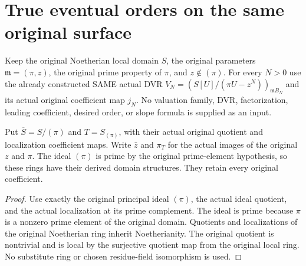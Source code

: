 \section{True eventual orders on the same original surface}

Keep the original Noetherian local domain $S$, the original parameters
$\mathfrak m=(\pi,z)$, the original prime property of $\pi$, and
$z\notin(\pi)$. For every $N>0$ use the already constructed SAME actual DVR
$V_N=(S[U]/(\pi U-z^N))_{\mathfrak mB_N}$ and its actual original coefficient
map $j_N$. No valuation family, DVR, factorization, leading coefficient,
desired order, or slope formula is supplied as an input.

\begin{definition}
\label{def:gauss-surface-original-residual-vertical-rings}
\leanok
Put $\overline S=S/(\pi)$ and $T=S_{(\pi)}$, with their actual original
quotient and localization coefficient maps. Write $\bar z$ and $\pi_T$ for
the actual images of the original $z$ and $\pi$. The ideal $(\pi)$ is prime
by the original prime-element hypothesis, so these rings have their derived
domain structures. They retain every original coefficient.
\end{definition}
\begin{proof}
Use exactly the original principal ideal $(\pi)$, the actual ideal quotient,
and the actual localization at its prime complement. The ideal is prime
because $\pi$ is a nonzero prime element of the original domain. Quotients
and localizations of the original Noetherian ring inherit Noetherianity.
The original quotient is nontrivial and is local by the surjective quotient
map from the original local ring. No substitute ring or chosen residue-field
isomorphism is used.
\end{proof}

